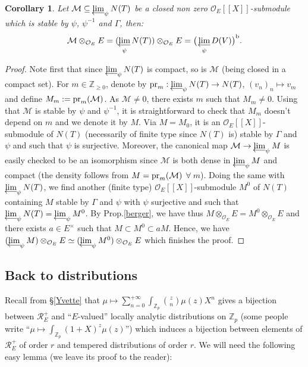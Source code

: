 \documentclass[11pt]{amsart}
\def\limproj{\mathop{\oalign{{\rm lim}\cr 
\hidewidth$\longleftarrow$\hidewidth\cr}}}
\def\Z{{\mathbb Z}_p}
\def\O{{\mathcal O}_E}
\newtheorem{cor}[definit]{\bf{Corollary}}
\begin{document}
\begin{cor}\label{versirr} 
Let ${\mathcal M}\subseteq \limproj_{\psi}N(T)$ be a closed non zero  
$\O[[X]]$-submodule which is stable by $\psi$, $\psi^{-1}$ and $\Gamma$, then: 
$${\mathcal M}\otimes_{\O}E=(\limproj_{\psi}N(T))\otimes_{\O}E 
=\big(\limproj_{\psi}D(V)\big)^{\rm b}.$$ 
\end{cor} 
\begin{proof}
Note first that since $\limproj_{\psi}N(T)$ is compact, so is
${\mathcal M}$ (being closed in a compact set). For $m\in {\mathbb
  Z}_{\geq 0}$, denote by   
${\rm pr}_m:\limproj_{\psi}N(T)\rightarrow N(T)$,  
$(v_n)_n\mapsto v_m$ and define $M_m:={\rm pr}_m({\mathcal M})$. 
As ${\mathcal M}\ne 0$, there exists $m$ such that $M_m\ne 0$. 
Using that ${\mathcal M}$ is stable by $\psi$ and $\psi^{-1}$, 
it is straightforward to check that $M_m$ doesn't depend on $m$  
and we denote it by $M$. Via $M=M_0$, it is an $\O[[X]]$-submodule 
of $N(T)$ (necessarily of finite type since $N(T)$ is) 
stable by $\Gamma$ and $\psi$ and  
such that $\psi$ is surjective. Moreover, the canonical map  
${\mathcal M}\rightarrow \limproj_{\psi}M$ is 
easily checked to be an isomorphism  
since ${\mathcal M}$ is both dense in $\limproj_{\psi}M$ and  
compact (the density follows from $M={\rm pr}_m({\mathcal M})$  
$\forall\ m$). Doing the same with $\limproj_{\psi}N(T)$, we  
find another (finite type) $\O[[X]]$-submodule $M^0$ of $N(T)$  
containing $M$ stable by $\Gamma$ and $\psi$ with $\psi$  
surjective and such that $\limproj_{\psi}N(T)=\limproj_{\psi}M^0$.  
By Prop.\ref{berger}, we have thus $M\otimes_{\O}E=M^0\otimes_{\O}E$  
and there exists $a\in E^{\times}$ such that 
$M\subset M^0\subset aM$. Hence, we have  
$(\limproj_{\psi}M)\otimes_{\O}E\simeq 
(\limproj_{\psi}M^0)\otimes_{\O}E$  
which finishes the proof. 
\end{proof} 
 
\subsection{Back to distributions}\label{distrback} 
 
Recall from \S\ref{Yvette} that $\mu\mapsto
\sum_{n=0}^{+\infty}\int_{\Z}{z\choose n}\mu(z)X^n$ gives a bijection
between ${\mathcal R}_E^+$ and ``$E$-valued'' locally analytic
distributions on $\Z$ (some people write ``$\mu\mapsto
\int_{\Z}(1+X)^z\mu(z)$'') which induces a bijection between elements
of ${\mathcal R}_E^+$ of order $r$ and tempered distributions of order
$r$. We will need the following easy lemma (we leave its proof to the
reader):  
 
\end{document}
